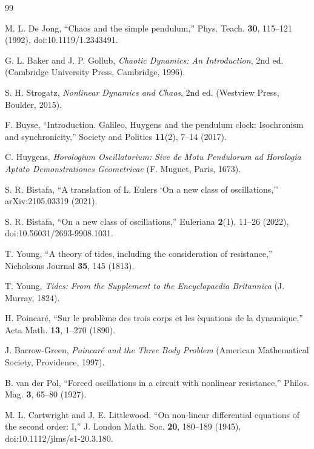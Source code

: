 \documentclass[aps,prb,reprint,floatfix]{revtex4-2}
\begin{document}
\begin{thebibliography}{99}

M. L. De Jong, ``Chaos and the simple pendulum,'' Phys. Teach. \textbf{30}, 115--121 (1992), doi:10.1119/1.2343491.

G. L. Baker and J. P. Gollub, \textit{Chaotic Dynamics: An Introduction}, 2nd ed. (Cambridge University Press, Cambridge, 1996).

S. H. Strogatz, \textit{Nonlinear Dynamics and Chaos}, 2nd ed. (Westview Press, Boulder, 2015).

F. Buyse, ``Introduction. Galileo, Huygens and the pendulum clock: Isochronism and synchronicity,'' Society and Politics \textbf{11}(2), 7--14 (2017).

C. Huygens, \textit{Horologium Oscillatorium: Sive de Motu Pendulorum ad Horologia Aptato Demonstrationes Geometricae} (F. Muguet, Paris, 1673).

S. R. Bistafa, ``A translation of L. Euler\textquotesingle s `On a new class of oscillations\textquotesingle,'' arXiv:2105.03319 (2021).

S. R. Bistafa, ``On a new class of oscillations,'' Euleriana \textbf{2}(1), 11--26 (2022), doi:10.56031/2693-9908.1031.

T. Young, ``A theory of tides, including the consideration of resistance,'' Nicholson\textquotesingle s Journal \textbf{35}, 145 (1813).

T. Young, \textit{Tides: From the Supplement to the Encyclopaedia Britannica} (J. Murray, 1824).

H. Poincar\'e, ``Sur le probl\`eme des trois corps et les \`equations de la dynamique,'' Acta Math. \textbf{13}, 1--270 (1890).

J. Barrow-Green, \textit{Poincar\'e and the Three Body Problem} (American Mathematical Society, Providence, 1997).

B. van der Pol, ``Forced oscillations in a circuit with nonlinear resistance,'' Philos. Mag. \textbf{3}, 65--80 (1927).

M. L. Cartwright and J. E. Littlewood, ``On non-linear differential equations of the second order: I,'' J. London Math. Soc. \textbf{20}, 180--189 (1945), doi:10.1112/jlms/s1-20.3.180.


\end{thebibliography}
\end{document}
